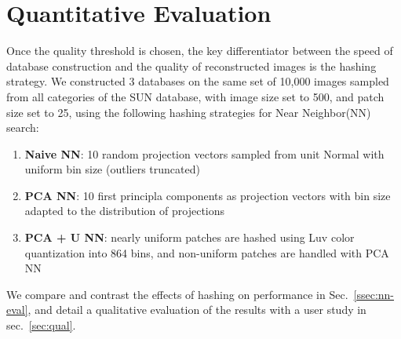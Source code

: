 \section{Quantitative Evaluation}\label{sec:performance}

Once the quality threshold is chosen, the key differentiator
between the speed of database construction and the quality of
reconstructed images is the hashing strategy.
We constructed 3 databases on the same set of
10,000 images sampled
from all categories of the SUN database, with image size
set to 500, and patch size set to 25, using the following
hashing strategies for Near Neighbor(NN) search:\\
\begin{enumerate}
\item \textbf{Naive NN}: 10 random projection vectors sampled from unit Normal with
uniform bin size (outliers truncated)
\item \textbf{PCA NN}: 10 first principla components as projection vectors with
bin size adapted to the distribution of projections
\item \textbf{PCA + U NN}: nearly uniform patches are hashed using Luv color
quantization into 864 bins, and non-uniform patches are handled with PCA NN
\end{enumerate}
We compare and contrast the effects of hashing on performance in
Sec.~\ref{ssec:nn-eval}, and detail a qualitative evaluation of
the results with a user study in sec.~\ref{sec:qual}.

